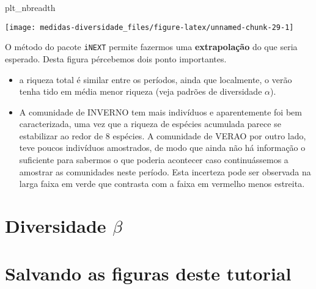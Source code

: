 \documentclass[
]{book}
\newenvironment{Shaded}{\begin{snugshade}}{\end{snugshade}}
\newcommand{\NormalTok}[1]{#1}
\begin{document}
\begin{Shaded}
\begin{Highlighting}[]
\NormalTok{plt\_nbreadth}
\end{Highlighting}
\end{Shaded}

\begin{center}\texttt{[image: medidas-diversidade\_files/figure-latex/unnamed-chunk-29-1]} \end{center}

O método do pacote \texttt{iNEXT} permite fazermos uma \textbf{extrapolação} do que seria esperado. Desta figura pércebemos dois ponto importantes.

\begin{itemize}
\item
  a riqueza total é similar entre os períodos, ainda que localmente, o verão tenha tido em média menor riqueza (veja padrões de diversidade \(\alpha\)).
\item
  A comunidade de INVERNO tem mais indivíduos e aparentemente foi bem caracterizada, uma vez que a riqueza de espécies acumulada parece se estabilizar ao redor de 8 espécies. A comunidade de VERAO por outro lado, teve poucos indivíduos amostrados, de modo que ainda não há informação o suficiente para sabermos o que poderia acontecer caso continuássemos a amostrar as comunidades neste período. Esta incerteza pode ser observada na larga faixa em verde que contrasta com a faixa em vermelho menos estreita.
\end{itemize}

\hypertarget{diversidade-beta}{%
\section{\texorpdfstring{Diversidade \(\beta\)}{Diversidade \textbackslash beta}}\label{diversidade-beta}}

\hypertarget{salvando-as-figuras-deste-tutorial}{%
\section{Salvando as figuras deste tutorial}\label{salvando-as-figuras-deste-tutorial}}

  
\end{document}
